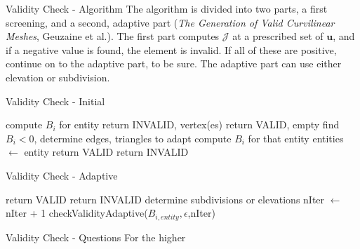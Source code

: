 \documentclass[12pt]{beamer}
\newcommand{\spa}{\vspace{0.5cm}\newline}
\begin{document}
\begin{frame}{Validity Check - Algorithm}
The algorithm is divided into two parts, a first screening, and a second, adaptive part ({\it The Generation of Valid Curvilinear Meshes}, Geuzaine et al.). \spa
The first part computes $\mathcal{J}$ at a prescribed set of $\mathbf{u}$, and if a negative value is found, the element is invalid. If all of these are positive, continue on to the adaptive part, to be sure. The adaptive part can use either elevation or subdivision.
\end{frame}
\begin{frame}{Validity Check - Initial}\scriptsize
\begin{algorithmic}[1]
\State compute $B_i$ for entity
\State return INVALID, vertex(es) 
\EndIf
{} 
\State return VALID, empty 
\Else
\State find $B_i < 0$, determine edges, triangles to adapt
    \State compute $B_i$ for that entity
    \State entities $\gets$ entity
    \EndIf
  \EndFor
\EndIf
{}
\State return VALID
\Else
\State return INVALID
\EndIf
\EndFunction
\end{algorithmic}
\end{frame}
\begin{frame}{Validity Check - Adaptive}\scriptsize
\begin{algorithmic}[1]
\State return VALID
\State return INVALID
\Else
\State determine subdivisions or elevations
  \State nIter $\gets$ nIter + 1
  \State checkValidityAdaptive($B_{i,entity},\epsilon$,nIter)
  \EndFor
\EndIf

\EndFunction
\end{algorithmic}
\end{frame}
\begin{frame}{Validity Check - Questions}
For the higher 
\end{frame}
\end{document}
